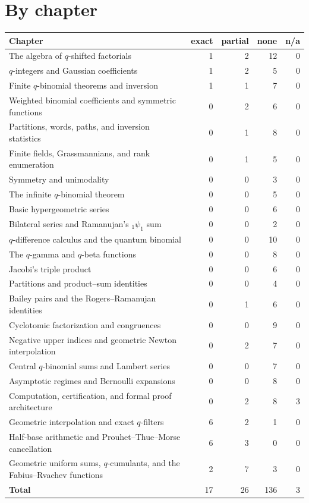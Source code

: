 \documentclass[11pt,oneside,openany]{book}
\theoremstyle{definition}
\theoremstyle{remark}
\newcommand{\statusexact}{\textsf{\color{statusgreen}exact}}
\newcommand{\statuspartial}{\textsf{\color{statusamber}partial}}
\newcommand{\statusnone}{\textsf{\color{statusred}none}}
\newcommand{\statusna}{\textsf{n/a}}
\begin{document}
\section{By chapter}

\begin{center}
\begin{tabular}{@{}p{}rrrr@{}}
\toprule
Chapter & \statusexact & \statuspartial & \statusnone & \statusna\\
\midrule
The algebra of $q$-shifted factorials & 1 & 2 & 12 & 0\\
$q$-integers and Gaussian coefficients & 1 & 2 & 5 & 0\\
Finite $q$-binomial theorems and inversion & 1 & 1 & 7 & 0\\
Weighted binomial coefficients and symmetric functions & 0 & 2 & 6 & 0\\
Partitions, words, paths, and inversion statistics & 0 & 1 & 8 & 0\\
Finite fields, Grassmannians, and rank enumeration & 0 & 1 & 5 & 0\\
Symmetry and unimodality & 0 & 0 & 3 & 0\\
The infinite $q$-binomial theorem & 0 & 0 & 5 & 0\\
Basic hypergeometric series & 0 & 0 & 6 & 0\\
Bilateral series and Ramanujan's \texorpdfstring{${}_1\psi_1$}{1psi1} sum & 0 & 0 & 2 & 0\\
$q$-difference calculus and the quantum binomial & 0 & 0 & 10 & 0\\
The $q$-gamma and $q$-beta functions & 0 & 0 & 8 & 0\\
Jacobi's triple product & 0 & 0 & 6 & 0\\
Partitions and product--sum identities & 0 & 0 & 4 & 0\\
Bailey pairs and the Rogers--Ramanujan identities & 0 & 1 & 6 & 0\\
Cyclotomic factorization and congruences & 0 & 0 & 9 & 0\\
Negative upper indices and geometric Newton interpolation & 0 & 2 & 7 & 0\\
Central $q$-binomial sums and Lambert series & 0 & 0 & 7 & 0\\
Asymptotic regimes and Bernoulli expansions & 0 & 0 & 8 & 0\\
Computation, certification, and formal proof architecture & 0 & 2 & 8 & 3\\
Geometric interpolation and exact $q$-filters & 6 & 2 & 1 & 0\\
Half-base arithmetic and Prouhet--Thue--Morse cancellation & 6 & 3 & 0 & 0\\
Geometric uniform sums, $q$-cumulants, and the Fabius--Rvachev functions & 2 & 7 & 3 & 0\\
\midrule
\textbf{Total} & 17 & 26 & 136 & 3\\
\bottomrule
\end{tabular}
\end{center}
\end{document}
